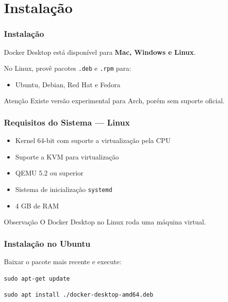 \section{Instalação}

\begin{frame}
  \frametitle{Instalação}
  Docker Desktop está disponível para \textbf{Mac, Windows e Linux}.

  \vspace{0.5em}
  No Linux, provê pacotes \texttt{.deb} e \texttt{.rpm} para:
  \begin{itemize}
    \item Ubuntu, Debian, Red Hat e Fedora
  \end{itemize}

  \vspace{0.5em}
  \begin{alertblock}{Atenção}
    Existe versão experimental para Arch, porém sem suporte oficial.
  \end{alertblock}
\end{frame}

\begin{frame}
  \frametitle{Requisitos do Sistema — Linux}
  \begin{itemize}
    \item Kernel 64-bit com suporte a virtualização pela CPU
    \item Suporte a KVM para virtualização
    \item QEMU 5.2 ou superior
    \item Sistema de inicialização \texttt{systemd}
    \item 4 GB de RAM
  \end{itemize}

  \vspace{0.5em}
  \begin{alertblock}{Observação}
    O Docker Desktop no Linux roda uma máquina virtual.
  \end{alertblock}
\end{frame}

\begin{frame}
  \frametitle{Instalação no Ubuntu}
  Baixar o pacote mais recente e execute:

  \vspace{0.5em}
  \texttt{sudo apt-get update}

  \vspace{0.3em}
  \texttt{sudo apt install ./docker-desktop-amd64.deb}
\end{frame}